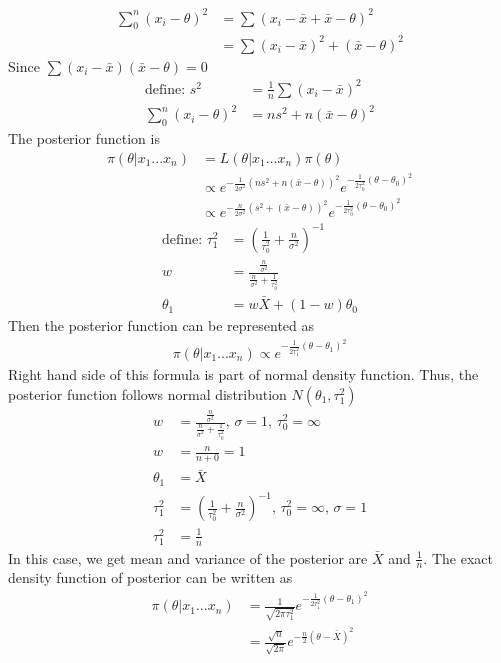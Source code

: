 \documentclass[11pt,letterpaper]{article}
\begin{document}
\begin{align*}
\sum_0^n (x_i - \theta)^2 &= \sum (x_i - \bar{x} + \bar{x} - \theta)^2 \\
&= \sum (x_i - \bar{x})^2 + (\bar{x} - \theta)^2 
\end{align*}
\noindent Since $\sum (x_i - \bar{x})(\bar{x} - \theta) = 0$
\begin{align*}
\text{define: } s^2 &= \frac{1}{n} \sum (x_i - \bar{x})^2 \\
\sum_0^n (x_i - \theta)^2 &= ns^2 + n(\bar{x} - \theta)^2
\end{align*}
\noindent The posterior function is
\begin{align*}
\pi(\theta | x_1...x_n) &= L(\theta | x_1...x_n) \pi(\theta) \\
&\propto e^{-\frac{1}{2 \sigma^2}(ns^2 + n(\bar{x} - \theta))^2} e^{-\frac{1}{2 \tau_0^2}(\theta - \theta_0)^2} \\
&\propto e^{-\frac{n}{2 \sigma^2}(s^2 + (\bar{x} - \theta))^2} e^{-\frac{1}{2 \tau_0^2}(\theta - \theta_0)^2} 
\end{align*}
\begin{align*}
\text{define: } \tau_1^2 &= (\frac{1}{\tau_0^2} + \frac{n}{\sigma^2})^{-1} \\
w &= \frac{\frac{n}{\sigma^2}}{\frac{n}{\sigma^2} + \frac{1}{\tau_0^2}} \\
\theta_1 &= w\bar{X} + (1-w)\theta_0
\end{align*}
Then the posterior function can be represented as 
\begin{align*}
\pi(\theta | x_1...x_n) \propto e^{-\frac{1}{2 \tau_1^2}(\theta - \theta_1)^2 }
\end{align*}
\noindent Right hand side of this formula is part of normal density function. Thus, the posterior function follows normal distribution $N(\theta_1, \tau_1^2)$
\begin{align*}
w &= \frac{\frac{n}{\sigma^2}}{\frac{n}{\sigma^2} + \frac{1}{\tau_0^2}} \text{, } \sigma = 1 \text{, } \tau_0^2 = \infty \\
w &= \frac{n}{n + 0} = 1 \\
\theta_1 &= \bar{X} \\
\tau_1^2 &= (\frac{1}{\tau_0^2} + \frac{n}{\sigma^2} )^{-1} \text{, } \tau_0^2 = \infty \text{, } \sigma = 1\\
\tau_1^2 &= \frac{1}{n}
\end{align*}
\noindent In this case, we get mean and variance of the posterior are $\bar{X}$ and $\frac{1}{n}$. The exact density function of posterior can be written as
\begin{align*}
\pi(\theta | x_1...x_n) &= \frac{1}{\sqrt{2 \pi \tau_1^2}} e^{-\frac{1}{2 \tau_1^2}(\theta - \theta_1)^2} \\
&= \frac{\sqrt{n}}{\sqrt{2 \pi}} e^{-\frac{n}{2}(\theta - \bar{X})^2}
\end{align*}
\end{document}
